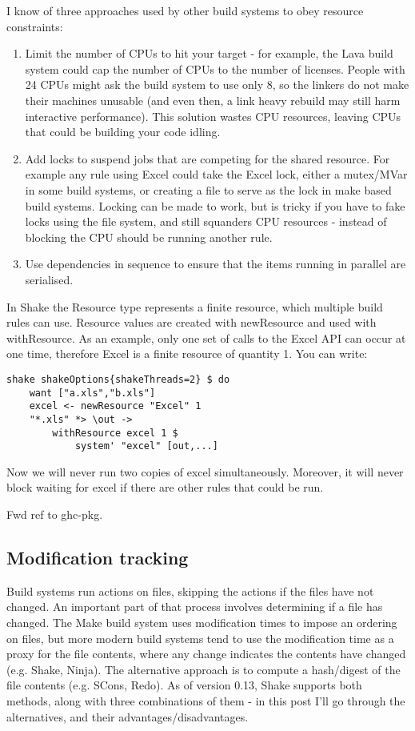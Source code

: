 I know of three approaches used by other build systems to obey resource constraints:

\begin{enumerate}
\item Limit the number of CPUs to hit your target - for example, the Lava build system could cap the number of CPUs to the number of licenses. People with 24 CPUs might ask the build system to use only 8, so the linkers do not make their machines unusable (and even then, a link heavy rebuild may still harm interactive performance). This solution wastes CPU resources, leaving CPUs that could be building your code idling.
\item Add locks to suspend jobs that are competing for the shared resource. For example any rule using Excel could take the Excel lock, either a mutex/MVar in some build systems, or creating a file to serve as the lock in make based build systems. Locking can be made to work, but is tricky if you have to fake locks using the file system, and still squanders CPU resources - instead of blocking the CPU should be running another rule.
\item Use dependencies in sequence to ensure that the items running in parallel are serialised.
\end{enumerate}

In Shake the Resource type represents a finite resource, which multiple build rules can use. Resource values are created with newResource and used with withResource. As an example, only one set of calls to the Excel API can occur at one time, therefore Excel is a finite resource of quantity 1. You can write:

\begin{lstlisting}
shake shakeOptions{shakeThreads=2} $ do
    want ["a.xls","b.xls"]
    excel <- newResource "Excel" 1
    "*.xls" *> \out ->
        withResource excel 1 $
            system' "excel" [out,...]
\end{lstlisting}

Now we will never run two copies of excel simultaneously. Moreover, it will never block waiting for excel if there are other rules that could be run.

Fwd ref to ghc-pkg.

\subsection{Modification tracking}

Build systems run actions on files, skipping the actions if the files have not changed. An important part of that process involves determining if a file has changed. The Make build system uses modification times to impose an ordering on files, but more modern build systems tend to use the modification time as a proxy for the file contents, where any change indicates the contents have changed (e.g. Shake, Ninja). The alternative approach is to compute a hash/digest of the file contents (e.g. SCons, Redo). As of version 0.13, Shake supports both methods, along with three combinations of them - in this post I'll go through the alternatives, and their advantages/disadvantages.


